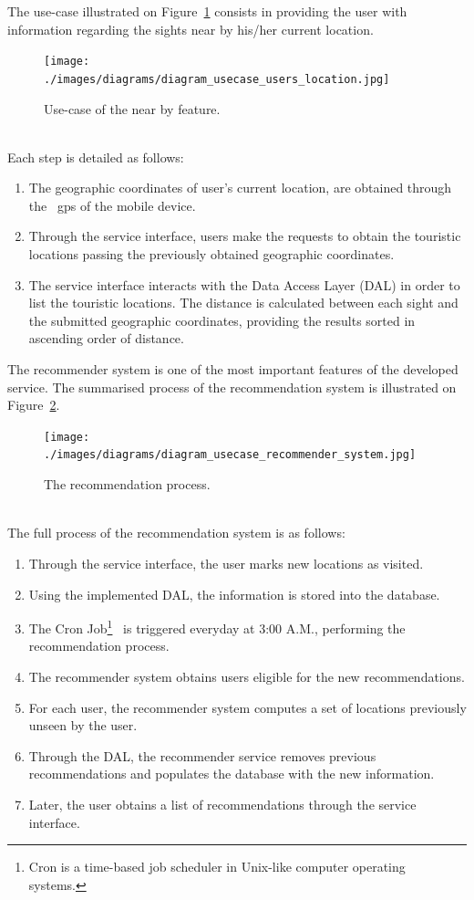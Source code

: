 The use-case illustrated on Figure~\ref{fig:useCaseFilterByLocation} consists in providing the user with information regarding the sights near by his/her current location.\\
\begin{figure}[h!]
 \centering
   \texttt{[image: ./images/diagrams/diagram\_usecase\_users\_location.jpg]}
   \caption{Use-case of the near by feature.}
   \label{fig:useCaseFilterByLocation}
\end{figure}\\
Each step is detailed as follows:
\begin{enumerate}
\item The geographic coordinates of user's current location, are obtained through the ~\gls{gps} of the mobile device.
\item Through the service interface, users make the requests to obtain the touristic locations passing the previously obtained geographic coordinates.
\item The service interface interacts with the Data Access Layer (DAL) in order to list the touristic locations. The distance is calculated between each sight and the submitted geographic coordinates, providing the results sorted in ascending order of distance.
\end{enumerate}
The recommender system is one of the most important features of the developed service. The summarised process of the recommendation system is illustrated on Figure~\ref{fig:useCaseRecommendationLocation}.\\
\begin{figure}[h!]
 \centering
   \texttt{[image: ./images/diagrams/diagram\_usecase\_recommender\_system.jpg]}
   \caption{The recommendation process.}
   \label{fig:useCaseRecommendationLocation}
\end{figure}\\
The full process of the recommendation system is as follows:
\begin{enumerate}
\item Through the service interface, the user marks new locations as visited.
\item Using the implemented DAL, the information is stored into the database.
\item The Cron Job\footnote{Cron is a time-based job scheduler in Unix-like computer operating systems.}~\cite{cronTab} is triggered everyday at 3:00 A.M., performing the recommendation process.
\item The recommender system obtains users eligible for the new recommendations.
\item For each user, the recommender system computes a set of locations previously unseen by the user.
\item Through the DAL, the recommender service removes previous recommendations and populates the database with the new information.
\item Later, the user obtains a list of recommendations through the service interface.
\end{enumerate}
